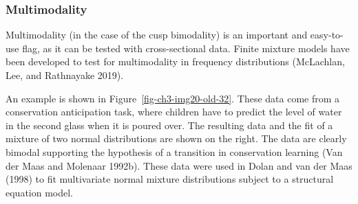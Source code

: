 \documentclass[
  a4paper,
  DIV=11,
  numbers=noendperiod,
  oneside]{scrreprt}
\newenvironment{Shaded}{\begin{snugshade}}{\end{snugshade}}
\newcommand{\AttributeTok}[1]{\textcolor[rgb]{0.40,0.45,0.13}{#1}}
\newcommand{\CommentTok}[1]{\textcolor[rgb]{0.37,0.37,0.37}{#1}}
\newcommand{\DecValTok}[1]{\textcolor[rgb]{0.68,0.00,0.00}{#1}}
\newcommand{\FunctionTok}[1]{\textcolor[rgb]{0.28,0.35,0.67}{#1}}
\newcommand{\NormalTok}[1]{\textcolor[rgb]{0.00,0.23,0.31}{#1}}
\newcommand{\OtherTok}[1]{\textcolor[rgb]{0.00,0.23,0.31}{#1}}
\newcommand{\SpecialCharTok}[1]{\textcolor[rgb]{0.37,0.37,0.37}{#1}}
\newcommand{\StringTok}[1]{\textcolor[rgb]{0.13,0.47,0.30}{#1}}
\begin{document}
\begin{Shaded}
\end{Shaded}

\hypertarget{sec-Multimodality}{%
\subsubsection{Multimodality}\label{sec-Multimodality}}

Multimodality (in the case of the cusp bimodality) is an important and
easy-to-use flag, as it can be tested with cross-sectional data. Finite
mixture models have been developed to test for multimodality in
frequency distributions (McLachlan, Lee, and Rathnayake 2019).

An example is shown in Figure~\ref{fig-ch3-img20-old-32}. These data
come from a conservation anticipation task, where children have to
predict the level of water in the second glass when it is poured over.
The resulting data and the fit of a mixture of two normal distributions
are shown on the right. The data are clearly bimodal supporting the
hypothesis of a transition in conservation learning (Van der Maas and
Molenaar 1992b). These data were used in Dolan and van der Maas (1998)
to fit multivariate normal mixture distributions subject to a structural
equation model.
\end{document}
